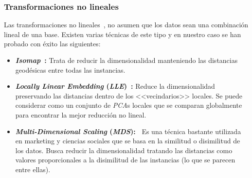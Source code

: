 \subsubsection{Transformaciones no lineales}

Las transformaciones no lineales~\cite{manifold}, no asumen que los datos sean una combinación lineal de una base. Existen varias técnicas de este tipo y en nuestro caso se han probado con éxito las siguientes: 

\begin{itemize}
	\item \textbf{\textit{Isomap}~\cite{isomap}:} Trata de reducir la dimensionalidad manteniendo las distancias geodésicas entre todas las instancias.
	\item \textbf{\textit{Locally Linear Embedding} (\textit{LLE})~\cite{lle}:} Reduce la dimensionalidad preservando las distancias dentro de los <<vecindarios>> locales. Se puede considerar como un conjunto de \textit{PCA}s locales que se comparan globalmente para encontrar la mejor reducción no lineal. 
	\item \textbf{\textit{Multi-Dimensional Scaling} (\textit{MDS}):~\cite{mds}} Es una técnica bastante utilizada en marketing y ciencias sociales que se basa en la similitud o disimilitud de los datos. Busca reducir la dimensionalidad tratando las distancias como valores proporcionales a la disimilitud de las instancias (lo que se parecen entre ellas).   
\end{itemize}

